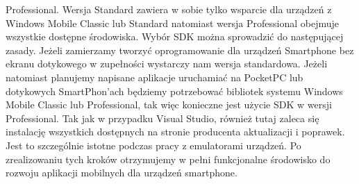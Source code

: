 Professional. Wersja Standard zawiera w sobie tylko wsparcie dla urządzeń z
Windows Mobile Classic lub Standard natomiast wersja Professional obejmuje
wszystkie dostępne środowiska. Wybór SDK można sprowadzić do następującej
zasady. Jeżeli zamierzamy tworzyć oprogramowanie dla urządzeń Smartphone bez
ekranu dotykowego w zupełności wystarczy nam wersja standardowa. Jeżeli
natomiast planujemy napisane aplikacje uruchamiać na PocketPC lub dotykowych
SmartPhon'ach będziemy potrzebować bibliotek systemu Windows Mobile Classic lub
Professional, tak więc konieczne jest użycie SDK w wersji Professional. Tak jak
w przypadku Visual Studio, również tutaj zaleca się instalację wszystkich
dostępnych na stronie producenta aktualizacji i poprawek. Jest to szczególnie
istotne podczas pracy z emulatorami urządzeń. Po zrealizowaniu tych kroków
otrzymujemy w pełni funkcjonalne środowisko do rozwoju aplikacji mobilnych dla
urządzeń smartphone.

